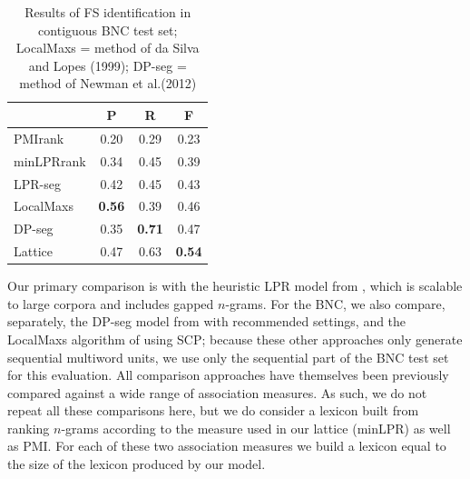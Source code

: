 \documentclass[11pt,letterpaper]{article}
\makeatletter
\def \al {al.\@ }
\makeatother
\begin{document}
 \begin{table}[!bt]
 
 \begin{center}
	
	 \begin{tabular}{lccc}

       \toprule
			& P & R & F\\
			 \midrule
			PMIrank & 0.20 & 0.29 & 0.23 \\
			minLPRrank & 0.34 & 0.45 & 0.39 \\
			LPR-seg & 0.42 & 0.45 & 0.43 \\
			LocalMaxs & \bf{0.56} & 0.39 & 0.46 \\
			DP-seg & 0.35 & \bf{0.71} & 0.47 \\
  \midrule
			Lattice & 0.47 & 0.63 & \bf{0.54} \\
       \bottomrule
 \end{tabular}
  \caption{ Results of FS identification in contiguous BNC test set; LocalMaxs = method of da Silva and Lopes (1999); DP-seg = method of Newman et \al (2012)}
	\label{tab:BNC}

 \end{center}

 \end{table}	



 Our primary comparison is with the heuristic LPR model from , which is scalable to large corpora and includes gapped $n$-grams. For the BNC, we also compare, separately, the DP-seg model from  with recommended settings, and the LocalMaxs algorithm of  using SCP; because these other approaches only generate sequential multiword units, we use only the sequential part of the BNC test set for this evaluation. All comparison approaches have themselves been previously compared against a wide range of association measures. As such, we do not repeat all these comparisons here, but we do consider a lexicon built from ranking $n$-grams according to the measure used in our lattice (minLPR) as well as PMI. For each of these two association measures we build a lexicon equal to the size of the lexicon produced by our model.

\end{document}
